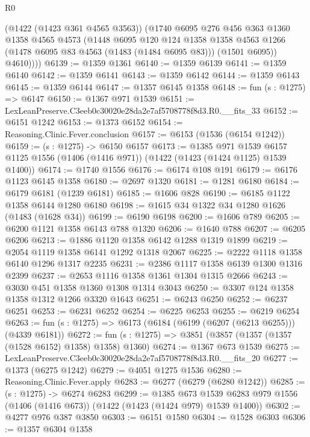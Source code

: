\begin{lexlean}{R0}
\begin{coremodule}
          (@1422 (@1423 @361 @4565 @3563))
          (@1740
            @6095
            @276
            @456
            @363
            @1360
            @1358
            @4565
            @4573
            (@1448
              @6095
              @120
              @124
              @1358
              @1358
              @4563
              @1266
              (@1478 @6095 @83 @4563 (@1483 (@1484 @6095 @83)))
              (@1501 @6095))
            @4610))))
@6139 := @1359 @1361
@6140 := @1359 @6139
@6141 := @1359 @6140
@6142 := @1359 @6141
@6143 := @1359 @6142
@6144 := @1359 @6143
@6145 := @1359 @6144
@6147 := @1357 @6145 @1358
@6148 := fun (s : @1275) => @6147
@6150 := @1367 @971 @1539
@6151 := LexLeanPreserve.C3eeb0c30020e28da2e7af5708778f8d3.R0.__fits_33
@6152 := @6151 @1242
@6153 := @1373 @6152
@6154 := Reasoning.Clinic.Fever.conclusion
@6157 := @6153 (@1536 (@6154 @1242))
@6159 := (s : @1275) -> @6150 @6157
@6173 := @1385
    @971
    @1539
    @6157
    @1125
    @1556
    (@1406 (@1416 @971))
    (@1422 (@1423 (@1424 @1125) @1539 @1400))
@6174 := @1740 @1556
@6176 := @6174 @108 @191
@6179 := @6176 @1123 @6145 @1358
@6180 := @2697 @1320
@6181 := @1281 @6180
@6184 := @6179 @6181 (@1239 @6181)
@6185 := @1606 @828
@6190 := @6185 @1122 @1358 @6144 @1280 @6180
@6198 := @1615 @34 @1322 @34 @1280 @1626 (@1483 (@1628 @34))
@6199 := @6190 @6198
@6200 := @1606 @789
@6205 := @6200 @1121 @1358 @6143 @788 @1320
@6206 := @1640 @788
@6207 := @6205 @6206
@6213 := @1886 @1120 @1358 @6142 @1288 @1319 @1899
@6219 := @2054 @1119 @1358 @6141 @1292 @1318 @2067
@6225 := @2222 @1118 @1358 @6140 @1296 @1317 @2235
@6231 := @2386 @1117 @1358 @6139 @1300 @1316 @2399
@6237 := @2653 @1116 @1358 @1361 @1304 @1315 @2666
@6243 := @3030 @451 @1358 @1360 @1308 @1314 @3043
@6250 := @3307 @124 @1358 @1358 @1312 @1266 @3320 @1643
@6251 := @6243 @6250
@6252 := @6237 @6251
@6253 := @6231 @6252
@6254 := @6225 @6253
@6255 := @6219 @6254
@6263 := fun (s : @1275) => @6173 (@6184 (@6199 (@6207 (@6213 @6255))) (@4339 @6181))
@6272 := fun (s : @1275) => @3851 (@3857 (@1357 (@1357 (@1528 @6152) @1358) @1358) @1360)
@6274 := @1367 @673 @1539
@6275 := LexLeanPreserve.C3eeb0c30020e28da2e7af5708778f8d3.R0.__fits_20
@6277 := @1373 (@6275 @1242)
@6279 := @4051 @1275 @1536
@6280 := Reasoning.Clinic.Fever.apply
@6283 := @6277 (@6279 (@6280 @1242))
@6285 := (s : @1275) -> @6274 @6283
@6299 := @1385
    @673
    @1539
    @6283
    @979
    @1556
    (@1406 (@1416 @673))
    (@1422 (@1423 (@1424 @979) @1539 @1400))
@6302 := @4277 @976 @387 @3850
@6303 := @6151 @1580
@6304 := @1528 @6303
@6306 := @1357 @6304 @1358

\end{coremodule}
\end{lexlean}
